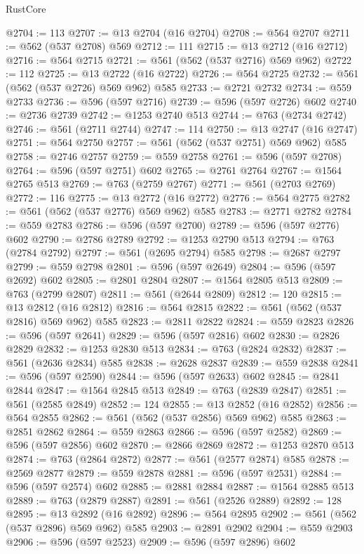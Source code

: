 \begin{lexlean}{RustCore}
\begin{coremodule}
@2704 := 113
@2707 := @13 @2704 (@16 @2704)
@2708 := @564 @2707
@2711 := @562 (@537 @2708) @569
@2712 := 111
@2715 := @13 @2712 (@16 @2712)
@2716 := @564 @2715
@2721 := @561 (@562 (@537 @2716) @569 @962)
@2722 := 112
@2725 := @13 @2722 (@16 @2722)
@2726 := @564 @2725
@2732 := @561 (@562 (@537 @2726) @569 @962) @585
@2733 := @2721 @2732
@2734 := @559 @2733
@2736 := @596 (@597 @2716)
@2739 := @596 (@597 @2726) @602
@2740 := @2736 @2739
@2742 := @1253 @2740 @513
@2744 := @763 (@2734 @2742)
@2746 := @561 (@2711 @2744)
@2747 := 114
@2750 := @13 @2747 (@16 @2747)
@2751 := @564 @2750
@2757 := @561 (@562 (@537 @2751) @569 @962) @585
@2758 := @2746 @2757
@2759 := @559 @2758
@2761 := @596 (@597 @2708)
@2764 := @596 (@597 @2751) @602
@2765 := @2761 @2764
@2767 := @1564 @2765 @513
@2769 := @763 (@2759 @2767)
@2771 := @561 (@2703 @2769)
@2772 := 116
@2775 := @13 @2772 (@16 @2772)
@2776 := @564 @2775
@2782 := @561 (@562 (@537 @2776) @569 @962) @585
@2783 := @2771 @2782
@2784 := @559 @2783
@2786 := @596 (@597 @2700)
@2789 := @596 (@597 @2776) @602
@2790 := @2786 @2789
@2792 := @1253 @2790 @513
@2794 := @763 (@2784 @2792)
@2797 := @561 (@2695 @2794) @585
@2798 := @2687 @2797
@2799 := @559 @2798
@2801 := @596 (@597 @2649)
@2804 := @596 (@597 @2692) @602
@2805 := @2801 @2804
@2807 := @1564 @2805 @513
@2809 := @763 (@2799 @2807)
@2811 := @561 (@2644 @2809)
@2812 := 120
@2815 := @13 @2812 (@16 @2812)
@2816 := @564 @2815
@2822 := @561 (@562 (@537 @2816) @569 @962) @585
@2823 := @2811 @2822
@2824 := @559 @2823
@2826 := @596 (@597 @2641)
@2829 := @596 (@597 @2816) @602
@2830 := @2826 @2829
@2832 := @1253 @2830 @513
@2834 := @763 (@2824 @2832)
@2837 := @561 (@2636 @2834) @585
@2838 := @2628 @2837
@2839 := @559 @2838
@2841 := @596 (@597 @2590)
@2844 := @596 (@597 @2633) @602
@2845 := @2841 @2844
@2847 := @1564 @2845 @513
@2849 := @763 (@2839 @2847)
@2851 := @561 (@2585 @2849)
@2852 := 124
@2855 := @13 @2852 (@16 @2852)
@2856 := @564 @2855
@2862 := @561 (@562 (@537 @2856) @569 @962) @585
@2863 := @2851 @2862
@2864 := @559 @2863
@2866 := @596 (@597 @2582)
@2869 := @596 (@597 @2856) @602
@2870 := @2866 @2869
@2872 := @1253 @2870 @513
@2874 := @763 (@2864 @2872)
@2877 := @561 (@2577 @2874) @585
@2878 := @2569 @2877
@2879 := @559 @2878
@2881 := @596 (@597 @2531)
@2884 := @596 (@597 @2574) @602
@2885 := @2881 @2884
@2887 := @1564 @2885 @513
@2889 := @763 (@2879 @2887)
@2891 := @561 (@2526 @2889)
@2892 := 128
@2895 := @13 @2892 (@16 @2892)
@2896 := @564 @2895
@2902 := @561 (@562 (@537 @2896) @569 @962) @585
@2903 := @2891 @2902
@2904 := @559 @2903
@2906 := @596 (@597 @2523)
@2909 := @596 (@597 @2896) @602

\end{coremodule}
\end{lexlean}
